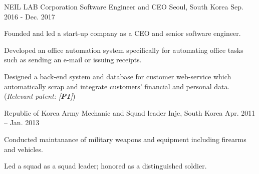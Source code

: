 


\begin{cventries}

\cventry
{NEIL LAB Corporation} %
{Software Engineer and CEO} %
{Seoul, South Korea} %
{Sep. 2016 - Dec. 2017} %
{ %
\begin{cvitems}
\item {Founded and led a start-up company as a CEO and senior software engineer.}
\item {Developed an office automation system specifically for automating office tasks such as sending an e-mail or issuing receipts.}
\item {Designed a back-end system and database for customer web-service which automatically scrap and integrate customers' financial and personal data. (\textit{Relevant patent: [\textbf{P1}]})}
\end{cvitems}
}

\cventry
{Republic of Korea Army} %
{Mechanic and Squad leader} %
{Inje, South Korea} %
{Apr. 2011 – Jan. 2013} %
{ %
\begin{cvitems}
\item {Conducted maintanance of military weapons and equipment including firearms and vehicles.}
\item {Led a squad as a squad leader; honored as a distinguished soldier.}
\end{cvitems}
}


\end{cventries}
